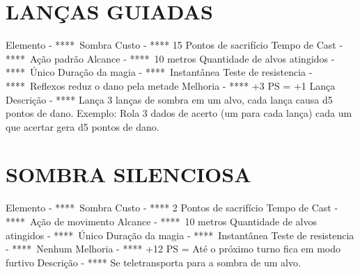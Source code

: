 \documentclass{article}%
\begin{document}
%
\section{LANÇAS GUIADAS}%
\label{sec:LANASGUIADAS}%
Elemento {-} ****~Sombra\newline%
Custo {-} **** 15 Pontos de sacrifício\newline%
Tempo de Cast {-} ****~Ação padrão\newline%
Alcance {-} ****~10 metros\newline%
Quantidade de alvos atingidos {-} ****~Único\newline%
Duração da magia {-} ****~Instantânea\newline%
Teste de resistencia {-} ****~Reflexos reduz o dano pela metade\newline%
Melhoria {-} **** +3 PS = +1 Lança\newline%
Descrição {-} **** Lança 3 lanças de sombra em um alvo, cada lança causa d5 pontos de dano. Exemplo: Rola 3 dados de acerto (um para cada lança) cada um que acertar gera d5 pontos de dano.\newline%

%
\section{SOMBRA SILENCIOSA}%
\label{sec:SOMBRASILENCIOSA}%
Elemento {-} ****~Sombra\newline%
Custo {-} **** 2 Pontos de sacrifício\newline%
Tempo de Cast {-} ****~Ação de movimento\newline%
Alcance {-} ****~10 metros\newline%
Quantidade de alvos atingidos {-} ****~Único\newline%
Duração da magia {-} ****~Instantânea\newline%
Teste de resistencia {-} ****~Nenhum\newline%
Melhoria {-} **** +12 PS = Até o próximo turno fica em modo furtivo\newline%
Descrição {-} **** Se teletransporta para a sombra de um alvo.\newline%

%
\end{document}

